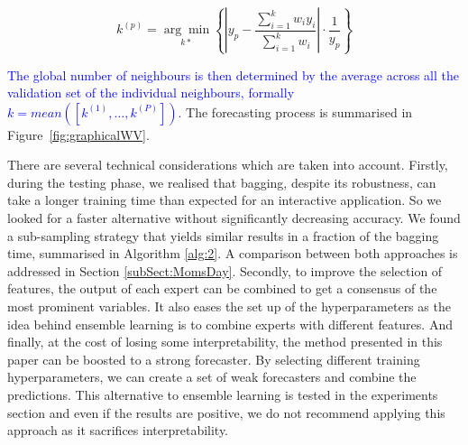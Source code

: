 \documentclass{ieeeaccess}
\newcommand{\myblue}[1]{\textcolor{blue}{#1}}
\begin{document}
\begin{equation}
k^{(p)} = \underset{k*}{\arg\min} \left\{ \left | y_p - \frac{ \sum_{i=1}^{k} w_i y_i} {\sum_{i=1}^{k} w_i}  \right | \cdot \frac{1}{y_p} \right\}
\label{eqn:eq_kNN}
\end{equation}

\myblue{The global number of neighbours is then determined by the average across all the validation set of the individual neighbours, formally $k = mean([k^{(1)}, \ldots, k^{(P)}])$. }The forecasting process is summarised in Figure~\ref{fig:graphicalWV}.


There are several technical considerations which are taken into account. Firstly, during the testing phase, we realised that bagging, despite its robustness, can take a longer training time than expected for an interactive application. So we looked for a faster alternative without significantly decreasing accuracy. We found a sub-sampling strategy that yields similar results in a fraction of the bagging time, summarised in Algorithm \ref{alg:2}. A comparison between both approaches is addressed in Section \ref{subSect:MomsDay}. Secondly, to improve the selection of features, the output of each expert can be combined to get a consensus of the most prominent variables. It also eases the set up of the hyperparameters as the idea behind ensemble learning is to combine experts with different features. And finally, at the cost of losing some interpretability, the method presented in this paper can be boosted to a strong forecaster. By selecting different training hyperparameters, we can create a set of weak forecasters and combine the predictions. This alternative to ensemble learning is tested in the experiments section and even if the results are positive, we do not recommend applying this approach as it sacrifices interpretability.
\end{document}
